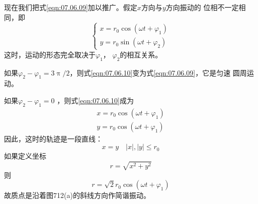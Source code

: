 现在我们把式\eqref{eqn:07.06.09}加以推广。假定$ x $方向与$ y $方向振动的
位相不一定相同，即
\begin{equation}\label{eqn:07.06.10}
  \begin{cases}
    x = r _ { 0 } \cos \left( \omega t + \varphi _ { 1 } \right) \\
    y = r _ { 0 } \sin \left( \omega t + \varphi _ { 2 } \right)
  \end{cases}
\end{equation}
这时，运动的形态完全取决于$  \varphi _ { 1 }   $， $ \varphi _ { 2 }   $的相互关系。

如果$  \varphi _ { 2 } - \varphi _ { 1 } = 3 \uppi / 2 $，则式\eqref{eqn:07.06.10}变为式\eqref{eqn:07.06.09}，它是匀速
圆周运动。

如果$   \varphi _ { 2 } - \varphi _ { 1 } = 0  $ ，则式\eqref{eqn:07.06.10}成为
\begin{equation*}
  \begin{split}
    x = r _ { 0 }  \cos \left( \omega t + \varphi _ { 1 } \right)  \\[-0.5em]
    y = r _ { 0 }  \cos \left( \omega t + \varphi _ { 1 } \right)
  \end{split}
\end{equation*}
因此，这时的轨迹是一段直线：
\begin{equation*}
  x = y \quad \left| x \right| , \left| y \right| \leqslant r _ { 0 }
\end{equation*}\label{err:07.06.01}
如果定义坐标
\begin{equation*}
  r = \sqrt { x ^ { 2 } + y ^ { 2 } }
\end{equation*}
则\vspace{-1.56em}
\begin{equation*}
  r = \sqrt { 2 } r _ { 0 }  \cos \left( \omega t +  \varphi _ { 1 } \right)
\end{equation*}
故质点是沿着图712(a)的斜线方向作简谐振动。

